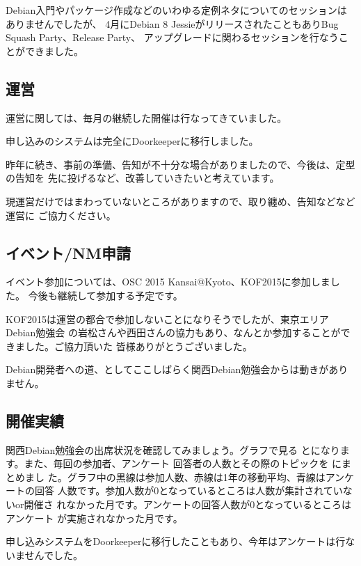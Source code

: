 \documentclass[mingoth,a4paper]{jsarticle}
\begin{document}
Debian入門やパッケージ作成などのいわゆる定例ネタについてのセッションはありませんでしたが、
4月にDebian 8 JessieがリリースされたこともありBug Squash Party、Release Party、
アップグレードに関わるセッションを行なうことができました。

\subsection{運営}

運営に関しては、毎月の継続した開催は行なってきていました。

申し込みのシステムは完全にDoorkeeperに移行しました。

昨年に続き、事前の準備、告知が不十分な場合がありましたので、今後は、定型の告知を
先に投げるなど、改善していきたいと考えています。

現運営だけではまわっていないところがありますので、取り纏め、告知などなど運営に
ご協力ください。

\subsection{イベント/NM申請}

イベント参加については、OSC 2015 Kansai@Kyoto、KOF2015に参加しました。
今後も継続して参加する予定です。

KOF2015は運営の都合で参加しないことになりそうでしたが、東京エリアDebian勉強会
の岩松さんや西田さんの協力もあり、なんとか参加することができました。ご協力頂いた
皆様ありがとうございました。

Debian開発者への道、としてここしばらく関西Debian勉強会からは動きがありません。

\subsection{開催実績}

関西Debian勉強会の出席状況を確認してみましょう。グラフで見る
とになります。また、毎回の参加者、アンケート
回答者の人数とその際のトピックを  にまとめまし
た。グラフ中の黒線は参加人数、赤線は1年の移動平均、青線はアンケートの回答
人数です。参加人数が$0$となっているところは人数が集計されていないor開催さ
れなかった月です。アンケートの回答人数が$0$となっているところはアンケート
が実施されなかった月です。

申し込みシステムをDoorkeeperに移行したこともあり、今年はアンケートは行ないませんでした。
\end{document}
